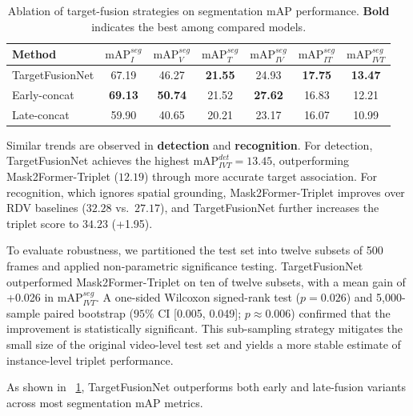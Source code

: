 \documentclass[pdflatex,sn-mathphys-num]{sn-jnl}%
\newcommand{\mAP}{\textrm{mAP}}
\newcommand{\tabref}[1]{\tablename~\ref{#1}}
\theoremstyle{thmstyleone}%
\theoremstyle{thmstyletwo}%
\theoremstyle{thmstylethree}%
\begin{document}
\begin{table}[t]
\centering
\caption{Ablation of target-fusion strategies on segmentation mAP performance. \textbf{Bold} indicates the best among compared models.}
\label{tab:ablation_seg}
\begin{tabular}{lcccccc}
\toprule
\textbf{Method} & $\mAP_{I}^{seg}$ & $\mAP_{V}^{seg}$ & $\mAP_{T}^{seg}$ & $\mAP_{IV}^{seg}$ & $\mAP_{IT}^{seg}$ & $\mAP_{IVT}^{seg}$ \\
\bottomrule
TargetFusionNet  & 67.19 & 46.27 & \textbf{21.55} & 24.93 & \textbf{17.75} & \textbf{13.47}\\
\hline
Early-concat  & \textbf{69.13} & \textbf{50.74 }& 21.52 & \textbf{27.62} & 16.83 & 12.21 \\
Late-concat & 59.90 & 40.65 & 20.21 & 23.17 & 16.07 & 10.99 \\
\hline
\end{tabular}
\end{table}


Similar trends are observed in \textbf{detection} and \textbf{recognition}.  
For detection, TargetFusionNet achieves the highest $\mAP_{IVT}^{det}=13.45$, outperforming Mask2Former-Triplet ($12.19$) through more accurate target association.  
For recognition, which ignores spatial grounding, Mask2Former-Triplet improves over RDV baselines ($32.28$ vs.\ $27.17$), and TargetFusionNet further increases the triplet score to $34.23$ (+1.95). 

To evaluate robustness, we partitioned the test set into twelve subsets of 500 frames and applied non-parametric significance testing.  
TargetFusionNet outperformed Mask2Former-Triplet on ten of twelve subsets, with a mean gain of +0.026 in $\mAP_{IVT}^{seg}$.  
A one-sided Wilcoxon signed-rank test ($p=0.026$) and 5{,}000-sample paired bootstrap ($95\%$ CI [0.005, 0.049]; $p\!\approx\!0.006$) confirmed that the improvement is statistically significant.  
This sub-sampling strategy mitigates the small size of the original video-level test set and yields a more stable estimate of instance-level triplet performance.

As shown in \tabref{tab:ablation_seg}, TargetFusionNet outperforms both early and late-fusion variants across most segmentation mAP metrics. 

\end{document}
